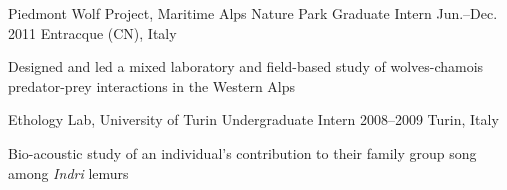 \begin{cventries}
  \cventry
    {Piedmont Wolf Project, Maritime Alps Nature Park} %
    {Graduate Intern} %
    {Jun.--Dec. 2011} %
    {Entracque (CN), Italy} %
    {
      \begin{cvitems} %
        \item {Designed and led a mixed laboratory and field-based study of wolves-chamois predator-prey interactions in the Western Alps}
      \end{cvitems} 
    }

  \cventry
    {Ethology Lab, University of Turin} %
    {Undergraduate Intern} %
    {2008--2009} %
    {Turin, Italy} %
    {
       \begin{cvitems} %
        \item {Bio-acoustic study of an individual's contribution to their family group song among \textit{Indri} lemurs}
      \end{cvitems} 
    }

\end{cventries}
